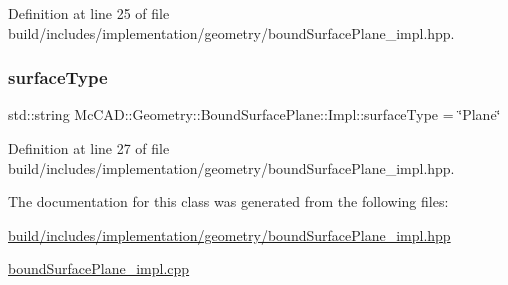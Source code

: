 Definition at line 25 of file build/includes/implementation/geometry/bound\+Surface\+Plane\+\_\+impl.\+hpp.

\mbox{\label{classMcCAD_1_1Geometry_1_1BoundSurfacePlane_1_1Impl_affc43d747b9963c91b61c5def9d3d556}} 
\subsubsection{\texorpdfstring{surface\+Type}{surfaceType}}
{\footnotesize\ttfamily std\+::string Mc\+C\+A\+D\+::\+Geometry\+::\+Bound\+Surface\+Plane\+::\+Impl\+::surface\+Type = \char`\"{}Plane\char`\"{}}



Definition at line 27 of file build/includes/implementation/geometry/bound\+Surface\+Plane\+\_\+impl.\+hpp.



The documentation for this class was generated from the following files\+:\begin{DoxyCompactItemize}
\item 
\hyperlink{build_2includes_2implementation_2geometry_2boundSurfacePlane__impl_8hpp}{build/includes/implementation/geometry/bound\+Surface\+Plane\+\_\+impl.\+hpp}\item 
\hyperlink{boundSurfacePlane__impl_8cpp}{bound\+Surface\+Plane\+\_\+impl.\+cpp}\end{DoxyCompactItemize}

